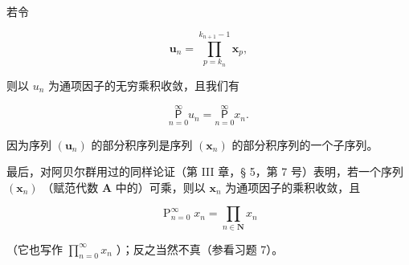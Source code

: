 若令

\[
\boldsymbol {u} _ {n} = \prod_ {p = k _ {n}} ^ {k _ {n + 1} - 1} \boldsymbol {x} _ {p},
\]

则以 \(u_{n}\) 为通项因子的无穷乘积收敛，且我们有

\[
\underset {n = 0} {\overset {\infty} {\mathsf {P}}} u _ {n} = \underset {n = 0} {\overset {\infty} {\mathsf {P}}} x _ {n}.
\]

因为序列 \((\boldsymbol{u}_{n})\) 的部分积序列是序列 \((\boldsymbol{x}_{n})\) 的部分积序列的一个子序列。

最后，对阿贝尔群用过的同样论证（第 III 章，§ 5，第 7 号）表明，若一个序列 \((\pmb{x}_n)\) （赋范代数 \(\mathbf{A}\) 中的）可乘，则以 \(\pmb{x}_n\) 为通项因子的乘积收敛，且

\[
\mathop {\text { P }} _ {n = 0} ^ {\infty} x _ {n} = \prod_ {n \in \mathbf {N}} x _ {n}
\]

（它也写作 \(\prod_{n=0}^{\infty} x_n\) ）；反之当然不真（参看习题 7）。
\relax{}
\ExerciseGroupsStart
